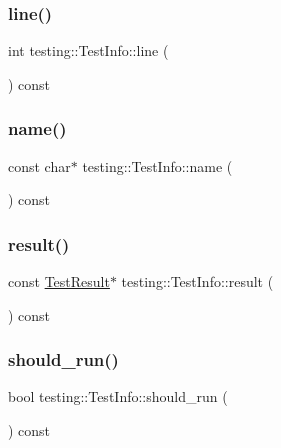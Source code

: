 \subsubsection{\texorpdfstring{line()}{line()}}
{\footnotesize\ttfamily int testing\+::\+Test\+Info\+::line (\begin{DoxyParamCaption}{ }\end{DoxyParamCaption}) const\hspace{0.3cm}{\ttfamily [inline]}}

\mbox{\label{classtesting_1_1_test_info_ac2581b45eccc9a3b94cb41c4807d0e34}} 
\subsubsection{\texorpdfstring{name()}{name()}}
{\footnotesize\ttfamily const char$\ast$ testing\+::\+Test\+Info\+::name (\begin{DoxyParamCaption}{ }\end{DoxyParamCaption}) const\hspace{0.3cm}{\ttfamily [inline]}}

\mbox{\label{classtesting_1_1_test_info_aee8cb884c95cd446129aba936b4159e0}} 
\subsubsection{\texorpdfstring{result()}{result()}}
{\footnotesize\ttfamily const \mbox{\hyperlink{classtesting_1_1_test_result}{Test\+Result}}$\ast$ testing\+::\+Test\+Info\+::result (\begin{DoxyParamCaption}{ }\end{DoxyParamCaption}) const\hspace{0.3cm}{\ttfamily [inline]}}

\mbox{\label{classtesting_1_1_test_info_a866e33b5bc5ab2a6e5375fc7d3af0f96}} 
\subsubsection{\texorpdfstring{should\_run()}{should\_run()}}
{\footnotesize\ttfamily bool testing\+::\+Test\+Info\+::should\+\_\+run (\begin{DoxyParamCaption}{ }\end{DoxyParamCaption}) const\hspace{0.3cm}{\ttfamily [inline]}}

